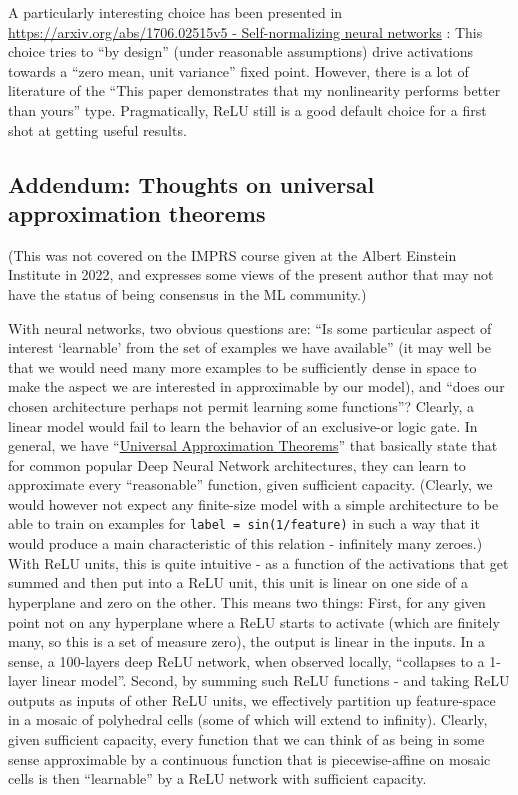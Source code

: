 \documentclass[11pt]{article}
\begin{document}
A particularly interesting choice has been presented in
\href{https://arxiv.org/abs/1706.02515v5}{https://arxiv.org/abs/1706.02515v5
- Self-normalizing neural networks} \cite{klambauer2017self}: This choice tries to ``by design''
(under reasonable assumptions) drive activations towards a ``zero mean,
unit variance'' fixed point. However, there is a lot of literature of
the ``This paper demonstrates that my nonlinearity performs better than
yours'' type. Pragmatically, ReLU still is a good default choice for a
first shot at getting useful results.

    \hypertarget{addendum-thoughts-on-universal-approximation-theorems}{%
\subsection{Addendum: Thoughts on universal approximation
theorems}\label{addendum-thoughts-on-universal-approximation-theorems}}

(This was not covered on the IMPRS course given at the Albert Einstein
Institute in 2022, and expresses some views of the present author that
may not have the status of being consensus in the ML community.)

With neural networks, two obvious questions are: ``Is some particular
aspect of interest `learnable' from the set of examples we have
available'' (it may well be that we would need many more examples to be
sufficiently dense in space to make the aspect we are interested in
approximable by our model), and ``does our chosen architecture perhaps
not permit learning some functions''? Clearly, a linear model would fail
to learn the behavior of an exclusive-or logic gate. In general, we have
``\href{https://en.wikipedia.org/wiki/Universal_approximation_theorem}{Universal
Approximation Theorems}'' that basically state that for common popular
Deep Neural Network architectures, they can learn to approximate every
``reasonable'' function, given sufficient capacity. (Clearly, we would
however not expect any finite-size model with a simple architecture to
be able to train on examples for \texttt{label\ =\ sin(1/feature)} in
such a way that it would produce a main characteristic of this relation
- infinitely many zeroes.) With ReLU units, this is quite intuitive - as
a function of the activations that get summed and then put into a ReLU
unit, this unit is linear on one side of a hyperplane and zero on the
other. This means two things: First, for any given point not on any
hyperplane where a ReLU starts to activate (which are finitely many, so
this is a set of measure zero), the output is linear in the inputs. In a
sense, a 100-layers deep ReLU network, when observed locally,
``collapses to a 1-layer linear model''. Second, by summing such ReLU
functions - and taking ReLU outputs as inputs of other ReLU units, we
effectively partition up feature-space in a mosaic of polyhedral cells
(some of which will extend to infinity). Clearly, given sufficient
capacity, every function that we can think of as being in some sense
approximable by a continuous function that is piecewise-affine on mosaic
cells is then ``learnable'' by a ReLU network with sufficient capacity.
\end{document}
